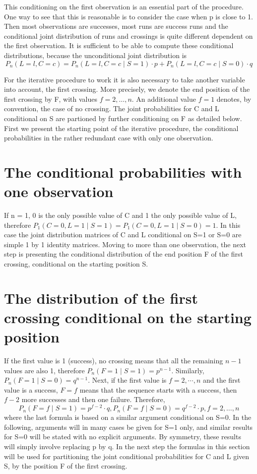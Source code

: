 This conditioning on the first observation is an essential part of the procedure. One way to see that this is reasonable is to consider the case when p is close to 1. Then most observations are successes, most runs are success runs and the conditional joint distribution of runs and crossings is quite different dependent on the first observation. It is sufficient to be able to compute these conditional distributions, because the unconditional joint distribution is
$$P_n (L=l,C=c) = P_n (L=l,C=c \mid S=1) \cdot p + P_n (L=l,C=c \mid S=0) \cdot q$$

For the iterative procedure to work it is also necessary to take another variable into account, the first crossing. More precisely, we denote the end position of the first crossing by F, with values $f=2, \ldots ,n$. An additional value $f=1$ denotes, by convention, the case of no crossing. The joint probabilities for C and L conditional on S are partioned by further conditioning on F as detailed below. First we present the starting point of the iterative procedure, the conditional probabilities in  the rather redundant case with only one observation.

\section{The conditional probabilities with one observation}

If n = 1, 0 is the only possible value of C and 1 the only possible value of L, therefore $P_1 (C=0,L=1 \mid S=1) = P_1 (C=0,L=1 \mid S=0) = 1$. In this case the joint distribution matrices of C and L conditional on S=1 or S=0 are simple 1 by 1 identity matrices. Moving to more than one observation, the next step is presenting the conditional distribution of the end position F of the first crossing, conditional on the starting position S.

\section{The distribution of the first crossing conditional on the starting position}

If the first value is 1 (success), no crossing means that all the remaining $n-1$ values are also 1, therefore $P_n (F=1 \mid S=1) = p^{n-1}$. Similarly, $P_n(F=1 \mid S=0) = q^{n-1}$. Next, if the first value is $f=2, \cdots ,n$ and the first value is a success, $F=f$ means that the sequence starts with a success, then $f-2$ more successes and then one failure. Therefore, $$P_n (F=f \mid S=1) = p^{f-2} \cdot q, P_n (F=f \mid S=0) =q^{f-2} \cdot p, f=2, \ldots ,n$$
where the last formula is based on a similar argument conditional on S=0. In the following, arguments will in many cases be given for S=1 only, and similar results for S=0 will be stated with no explicit arguments. By symmetry, these results will simply involve replacing p by q. In the next step the formulas in this section will be used for partitioning the joint conditional probabilities for C and L given S, by the position F of the first crossing. 

